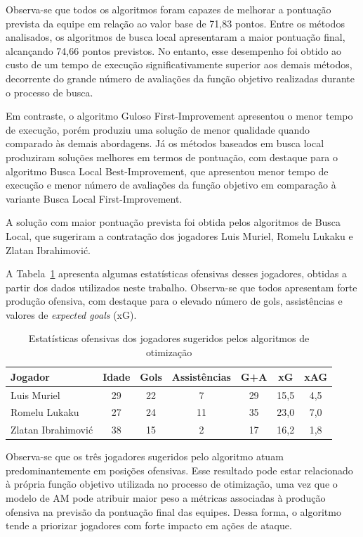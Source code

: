 Observa-se que todos os algoritmos foram capazes de melhorar a pontuação prevista 
da equipe em relação ao valor base de 71,83 pontos. 
Entre os métodos analisados, os algoritmos de busca local apresentaram a maior 
pontuação final, alcançando 74,66 pontos previstos. 
No entanto, esse desempenho foi obtido ao custo de um tempo de execução significativamente 
superior aos demais métodos, decorrente do grande número de avaliações 
da função objetivo realizadas durante o processo de busca.

Em contraste, o algoritmo Guloso First-Improvement apresentou o menor 
tempo de execução, porém produziu uma solução de menor qualidade quando comparado 
às demais abordagens. 
Já os métodos baseados em busca local produziram soluções melhores
em termos de pontuação, com destaque para o algoritmo Busca Local Best-Improvement, 
que apresentou menor tempo de execução e menor número de avaliações da função objetivo 
em comparação à variante Busca Local First-Improvement.

A solução com maior pontuação prevista foi obtida pelos algoritmos de Busca Local, que sugeriram a contratação dos jogadores Luis Muriel, Romelu Lukaku 
e Zlatan Ibrahimović.

A Tabela~\ref{tab:jogadores_sugeridos} apresenta algumas estatísticas ofensivas desses jogadores, obtidas a partir dos dados utilizados neste trabalho. 
Observa-se que todos apresentam forte produção ofensiva, com destaque para o elevado número de gols, assistências e valores de \textit{expected goals} (xG).

\begin{table}[hbt]
\centering
\caption{Estatísticas ofensivas dos jogadores sugeridos pelos algoritmos de otimização}
\label{tab:jogadores_sugeridos}

\begin{tabular}{lcccccc}
\hline
Jogador & Idade & Gols & Assistências & G+A & xG & xAG \\
\hline
Luis Muriel & 29 & 22 & 7 & 29 & 15,5 & 4,5 \\
Romelu Lukaku & 27 & 24 & 11 & 35 & 23,0 & 7,0 \\
Zlatan Ibrahimović & 38 & 15 & 2 & 17 & 16,2 & 1,8 \\
\hline
\end{tabular}

\vspace{.3cm}
\end{table}

Observa-se que os três jogadores sugeridos pelo algoritmo atuam predominantemente 
em posições ofensivas. Esse resultado pode estar relacionado à própria função 
objetivo utilizada no processo de otimização, uma vez que o modelo de AM pode 
atribuir maior peso a métricas associadas à produção ofensiva na previsão da pontuação 
final das equipes. Dessa forma, o algoritmo tende a priorizar jogadores com forte 
impacto em ações de ataque.

